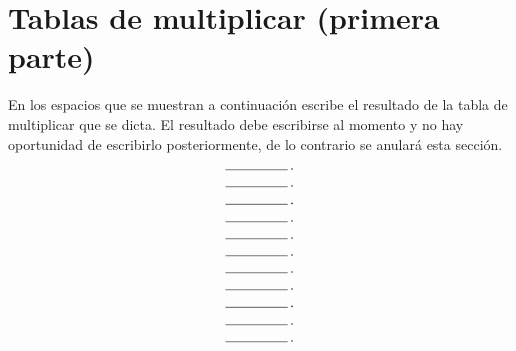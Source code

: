 \documentclass[11pt]{article}
\begin{document}
\setcounter{equation}{0} 

\section{Tablas de multiplicar {\normalsize(primera parte)}}
En los espacios que se muestran a continuaci\'on escribe el resultado de la
tabla de multiplicar que se dicta. El resultado debe escribirse al momento y no
hay oportunidad de escribirlo posteriormente, de lo contrario se anular\'a esta
secci\'on.

\begin{center}
\begin{multicols}{5}

    \begin{equation} \text{\line(1,0){45}\,.} \end{equation}

    \begin{equation} \text{\line(1,0){45}\,.} \end{equation}

    \begin{equation} \text{\line(1,0){45}\,.} \end{equation}

    \begin{equation} \text{\line(1,0){45}\,.} \end{equation}

    \begin{equation} \text{\line(1,0){45}\,.} \end{equation}

    \begin{equation} \text{\line(1,0){45}\,.} \end{equation}

    \begin{equation} \text{\line(1,0){45}\,.} \end{equation}

    \begin{equation} \text{\line(1,0){45}\,.} \end{equation}

    \begin{equation} \text{\line(1,0){45}\,.} \end{equation}

    \begin{equation} \text{\line(1,0){45}\,.} \end{equation}

    \begin{equation} \text{\line(1,0){45}\,.} \end{equation}


\end{multicols}
\end{center}
\end{document}
